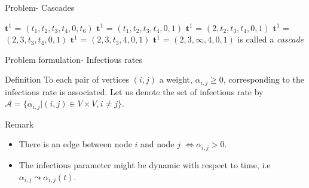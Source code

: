 \documentclass{beamer}
\begin{document}
\begin{frame}{Problem- Cascades}
\begin{figure}
\begin{subfigure}{.4\textwidth}
\end{subfigure}
\end{figure}
 {$\textbf{t}^1$ = $(t_1,t_2,t_3,t_4,0,t_6)$}
 {$\textbf{t}^1$ = $(t_1,t_2,t_3,t_4,0,1)$}
 {$\textbf{t}^1$ = $(2,t_2,t_3,t_4,0,1)$}
 {$\textbf{t}^1$ = $(2,3,t_3,t_4,0,1)$}
 {$\textbf{t}^1$ = $(2,3,t_3,4,0,1)$}
 {$\textbf{t}^1$ = $(2,3,\infty,4,0,1)$ is called a \textit{cascade}}
\end{frame}
\begin{frame}{Problem formulation- Infectious rates}
\begin{block}{Definition}
To each pair of vertices $(i,j)$ a weight, $\alpha_{i,j} \geq 0$, corresponding to the infectious rate is associated. Let us denote the set of infectious rate by $\mathscr{A} = \{\alpha_{i,j}|(i,j)\in V \times V, i\neq j\}.$
\end{block}
\begin{block}{Remark}
\begin{itemize}
    \item There is an edge between node $i$ and node $j$ $\iff \alpha_{i,j} > 0$.
    \item The infectious parameter might be dynamic with respect to time, i.e $\alpha_{i,j} \leadsto \alpha_{i,j}(t)$.
\end{itemize}
\end{block}
\end{frame}
\end{document}
